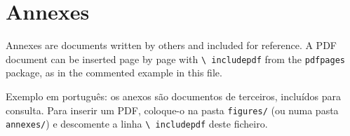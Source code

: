 \chapter{Annexes}
\label{app:annexes}

Annexes are documents written by others and included for reference. A PDF
document can be inserted page by page with \texttt{\textbackslash
includepdf} from the \texttt{pdfpages} package, as in the commented example
in this file.

\begin{otherlanguage}{portuguese}
Exemplo em português: os anexos são documentos de terceiros, incluídos para
consulta. Para inserir um PDF, coloque-o na pasta \texttt{figures/} (ou numa
pasta \texttt{annexes/}) e descomente a linha \texttt{\textbackslash
includepdf} deste ficheiro.
\end{otherlanguage}

% 
